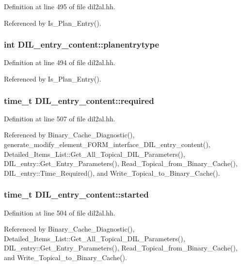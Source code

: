 Definition at line 495 of file dil2al.hh.

Referenced by Is\_\-Plan\_\-Entry().
\subsubsection{\setlength{\rightskip}{0pt plus 5cm}int DIL\_\-entry\_\-content::planentrytype\hspace{0.3cm}{\tt  [protected]}}\label{classDIL__entry__content_n1}




Definition at line 494 of file dil2al.hh.

Referenced by Is\_\-Plan\_\-Entry().
\subsubsection{\setlength{\rightskip}{0pt plus 5cm}time\_\-t DIL\_\-entry\_\-content::required}\label{classDIL__entry__content_m1}




Definition at line 507 of file dil2al.hh.

Referenced by Binary\_\-Cache\_\-Diagnostic(), generate\_\-modify\_\-element\_\-FORM\_\-interface\_\-DIL\_\-entry\_\-content(), Detailed\_\-Items\_\-List::Get\_\-All\_\-Topical\_\-DIL\_\-Parameters(), DIL\_\-entry::Get\_\-Entry\_\-Parameters(), Read\_\-Topical\_\-from\_\-Binary\_\-Cache(), DIL\_\-entry::Time\_\-Required(), and Write\_\-Topical\_\-to\_\-Binary\_\-Cache().
\subsubsection{\setlength{\rightskip}{0pt plus 5cm}time\_\-t DIL\_\-entry\_\-content::started}\label{classDIL__entry__content_m0}




Definition at line 504 of file dil2al.hh.

Referenced by Binary\_\-Cache\_\-Diagnostic(), Detailed\_\-Items\_\-List::Get\_\-All\_\-Topical\_\-DIL\_\-Parameters(), DIL\_\-entry::Get\_\-Entry\_\-Parameters(), Read\_\-Topical\_\-from\_\-Binary\_\-Cache(), and Write\_\-Topical\_\-to\_\-Binary\_\-Cache().
